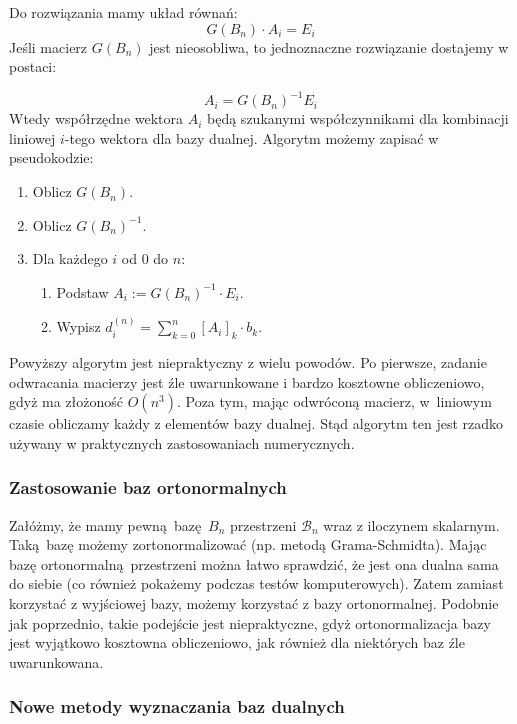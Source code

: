 \documentclass{article}
\begin{document}
Do rozwiązania mamy układ równań:
$$G(B_n) \cdot A_i = E_i $$
Jeśli macierz $G(B_n)$ jest nieosobliwa, to jednoznaczne rozwiązanie dostajemy w postaci:

$$A_i = G(B_n)^{-1} E_i$$
Wtedy współrzędne wektora $A_i$ będą szukanymi współczynnikami dla kombinacji liniowej $i$-tego wektora dla bazy dualnej. Algorytm możemy zapisać w pseudokodzie:

\begin{enumerate}
\item Oblicz $G(B_n)$.
\item Oblicz $G(B_n)^{-1}$.
\item Dla każdego $i$ od $0$ do $n$:
\begin{enumerate}
	\item Podstaw $A_i := G(B_n)^{-1} \cdot E_i$.
	\item Wypisz $d_{i}^{(n)} = \sum_{k=0}^n [A_i]_k \cdot b_k$.
\end{enumerate}	
\end{enumerate}

Powyższy algorytm jest niepraktyczny z wielu powodów. Po pierwsze, zadanie odwracania macierzy jest źle uwarunkowane i bardzo kosztowne obliczeniowo, gdyż ma złożoność  $O(n^3)$. Poza tym, mając odwróconą macierz, w~liniowym czasie obliczamy każdy z elementów bazy dualnej. Stąd algorytm ten jest rzadko używany w praktycznych zastosowaniach numerycznych.

\subsubsection{Zastosowanie baz ortonormalnych}
\label{dualnezdef}

Załóżmy, że mamy pewną bazę $B_n$ przestrzeni $\mathcal{B}_n$ wraz z iloczynem skalarnym. Taką bazę możemy zortonormalizować (np. metodą Grama-Schmidta). Mając bazę ortonormalną przestrzeni można łatwo sprawdzić, że jest ona dualna sama do siebie (co również pokażemy podczas testów komputerowych). Zatem zamiast korzystać z wyjściowej bazy, możemy korzystać z bazy ortonormalnej. Podobnie jak poprzednio, takie podejście jest niepraktyczne, gdyż ortonormalizacja bazy jest wyjątkowo kosztowna obliczeniowo, jak również dla niektórych baz źle uwarunkowana.

\subsubsection{Nowe metody wyznaczania baz dualnych}
\end{document}
